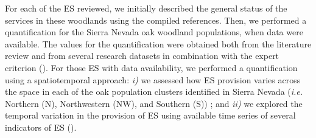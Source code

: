 For each of the ES reviewed, we initially described the general status of the services in these woodlands using the compiled references. Then, we performed a quantification for the Sierra Nevada oak woodland populations, when data were available. The values for the quantification were obtained both from the literature review and from several research datasets in combination with the expert criterion (). For those ES with data availability, we performed a quantification using a spatiotemporal approach: \emph{i)} we assessed how ES provision varies across the space in each of the oak population clusters identified in Sierra Nevada (\emph{i.e.} Northern (N), Northwestern (NW), and Southern (S)) \autocite[ see][]{PerezLuqueetal2021EcologicalDiversity}; and \emph{ii)} we explored the temporal variation in the provision of ES using available time series of several indicators of ES (). 


